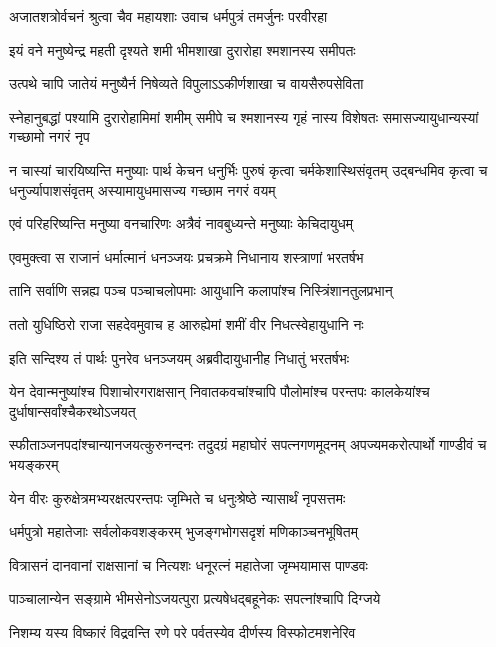 \twolineshloka
{अजातशत्रोर्वचनं श्रुत्वा चैव महायशाः}
{उवाच धर्मपुत्रं तमर्जुनः परवीरहा}


\twolineshloka
{इयं वने मनुष्येन्द्र महती दृश्यते शमी}
{भीमशाखा दुरारोहा श्मशानस्य समीपतः}


\twolineshloka
{उत्पथे चापि जातेयं मनुष्यैर्न निषेव्यते}
{विपुलाऽऽकीर्णशाखा च वायसैरुपसेविता}


\onelineshloka
{स्नेहानुबद्धां पश्यामि दुरारोहामिमां शमीम्}
\twolineshloka
{समीपे च श्मशानस्य गृहं नास्य विशेषतः}
{समासज्यायुधान्यस्यां गच्छामो नगरं नृप}


\onelineshloka
{न चास्यां चारयिष्यन्ति मनुष्याः पार्थ केचन}
\threelineshloka
{धनुर्भिः पुरुषं कृत्वा चर्मकेशास्थिसंवृतम्}
{उद्बन्धमिव कृत्वा च धनुर्ज्यापाशसंवृतम्}
{अस्यामायुधमासज्य गच्छाम नगरं वयम्}


\twolineshloka
{एवं परिहरिष्यन्ति मनुष्या वनचारिणः}
{अत्रैवं नावबुध्यन्ते मनुष्याः केचिदायुधम्}



\twolineshloka
{एवमुक्त्वा स राजानं धर्मात्मानं धनञ्जयः}
{प्रचक्रमे निधानाय शस्त्राणां भरतर्षभ}


\twolineshloka
{तानि सर्वाणि सन्नह्य पञ्च पञ्चाचलोपमाः}
{आयुधानि कलापांश्च निस्त्रिंशानतुलप्रभान्}


\twolineshloka
{ततो युधिष्ठिरो राजा सहदेवमुवाच ह}
{आरुह्येमां शमीं वीर निधत्स्वेहायुधानि नः}


\twolineshloka
{इति सन्दिश्य तं पार्थः पुनरेव धनञ्जयम्}
{अब्रवीदायुधानीह निधातुं भरतर्षभः}



\threelineshloka
{येन देवान्मनुष्यांश्च पिशाचोरगराक्षसान्}
{निवातकवचांश्चापि पौलोमांश्च परन्तपः}
{कालकेयांश्च दुर्धाषान्सर्वांश्चैकरथोऽजयत्}


\threelineshloka
{स्फीताञ्जनपदांश्चान्यानजयत्कुरुनन्दनः}
{तदुदग्रं महाघोरं सपत्नगणमूदनम्}
{अपज्यमकरोत्पार्थो गाण्डीवं च भयङ्करम्}


\twolineshloka
{येन वीरः कुरुक्षेत्रमभ्यरक्षत्परन्तपः}
{जृम्भिते च धनुःश्रेष्ठे न्यासार्थं नृपसत्तमः}


\twolineshloka
{धर्मपुत्रो महातेजाः सर्वलोकवशङ्करम्}
{भुजङ्गभोगसदृशं मणिकाञ्चनभूषितम्}


\twolineshloka
{वित्रासनं दानवानां राक्षसानां च नित्यशः}
{धनूरत्नं महातेजा जृम्भयामास पाण्डवः}


\twolineshloka
{पाञ्चालान्येन सङ्ग्रामे भीमसेनोऽजयत्पुरा}
{प्रत्यषेधद्बहूनेकः सपत्नांश्चापि दिग्जये}


\twolineshloka
{निशम्य यस्य विष्कारं विद्रवन्ति रणे परे}
{पर्वतस्येव दीर्णस्य विस्फोटमशनेरिव}


